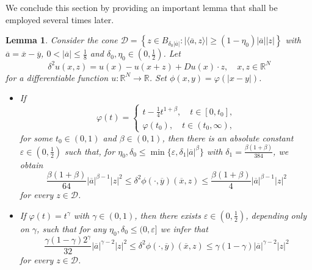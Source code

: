\documentclass[11pt,reqno]{amsart}
\numberwithin{equation}{section}
\newtheorem{lemma}[theorem]{Lemma}
\begin{document}
We conclude this section by providing an important lemma that shall be employed several times later.

\begin{lemma}
\label{lem2-1}
Consider the cone $\mathcal{D}=\left\{z\in B_{\delta_0|\overline{a}|}:|\langle\overline{a},z\rangle|\ge(1-\eta_0)|\overline{a}||z|\right\}$ with $\overline{a}=\overline{x}-\overline{y}$, $0<|\overline{a}|\le\frac{1}{8}$ and $\delta_0,\eta_0\in\left(0,\frac{1}{2}\right)$. Let
$$
\delta^2u(x,z)=u(x)-u(x+z)+Du(x)\cdot z, \quad  x,z\in\mathbb{R}^N
$$
for a differentiable function $u:\mathbb{R}^N\rightarrow\mathbb{R}$. Set $\phi(x,y)=\varphi(|x-y|)$.
\begin{itemize}
\item[(1)] If
\begin{equation*}
\varphi(t)=\begin{cases}t-\frac{1}{4}t^{1+\beta}, \quad t\in [0,t_0],\\
\varphi(t_0),  \quad t\in (t_0,\infty),
\end{cases}
\end{equation*}
for some $t_0\in(0,1)$ and $\beta\in(0,1)$, then there is an absolute constant $\varepsilon\in\left(0,\frac{1}{2}\right)$ such that, for $\eta_0,\delta_0\le\min\{\varepsilon, \delta_1|\overline{a}|^\beta\}$ with $\delta_1=\frac{\beta(1+\beta)}{384}$, we obtain
\begin{equation*}
\frac{\beta(1+\beta)}{64}|\overline{a}|^{\beta-1}|z|^2\le \delta^2\phi(\cdot,\overline{y})(\overline{x},z)\le\frac{\beta(1+\beta)}{4}|\overline{a}|^{\beta-1}|z|^2
\end{equation*}
for every $z\in \mathcal{D}$.

\item[(2)] If $\varphi(t)=t^\gamma$ with $\gamma\in(0,1)$, then there exists $\varepsilon\in\left(0,\frac{1}{2}\right)$, depending only on $\gamma$, such that for any $\eta_0,\delta_0\le(0, \varepsilon]$
we infer that
\begin{equation*}
\frac{\gamma(1-\gamma)2^\gamma}{32}|\overline{a}|^{\gamma-2}|z|^2\le \delta^2\phi(\cdot,\overline{y})(\overline{x},z)\le\gamma(1-\gamma)|\overline{a}|^{\gamma-2}|z|^2
\end{equation*}
for every $z\in \mathcal{D}$.
\end{itemize}
\end{lemma}
\end{document}
